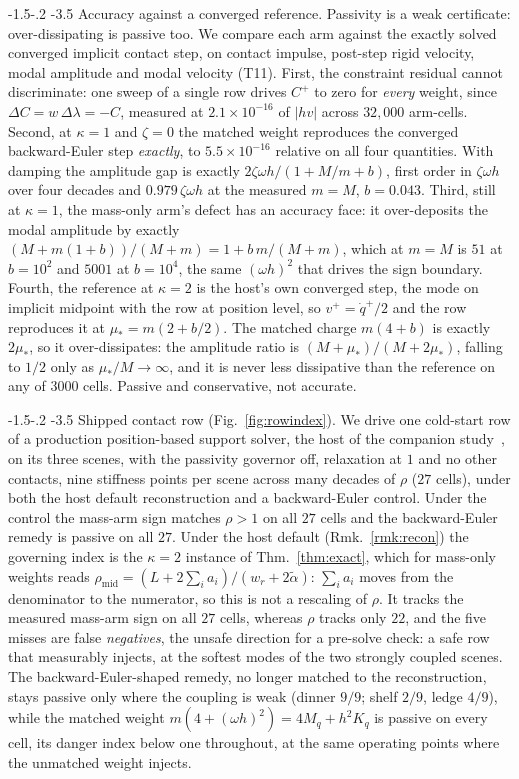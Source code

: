 \documentclass[sigconf,screen,review,anonymous]{acmart}
\makeatletter
\newcommand{\rih}{\def\@toclevel{4}%
  \@startsection{paragraph}{4}{\parindent}%
  {-1.5\p@ \@plus -1\p@ \@minus -.2\p@}%
  {-3.5\p@}%
  {\ACM@NRadjust{\@parfont\@adddotafter}}}
\newcommand{\Rr}{w_{r}}
\newcommand{\oh}{\omega h}
\theoremstyle{acmdefinition}
\makeatother
\begin{document}
\rih{Accuracy against a converged reference.} Passivity is a weak
certificate: over-dissipating is passive too. We compare each arm against the
exactly solved converged implicit contact step, on contact impulse, post-step
rigid velocity, modal amplitude and modal velocity (T11).
First, the constraint residual cannot discriminate: one sweep of a single
row drives $C^{+}$ to zero for \emph{every} weight, since
$\Delta C = w\,\Delta\lambda = -C$, measured at $2.1\times10^{-16}$ of $|hv|$ across
$32{,}000$ arm-cells. Second, at $\kappa = 1$ and $\zeta = 0$ the matched weight
reproduces the converged backward-Euler step \emph{exactly}, to
$5.5\times10^{-16}$ relative on all four quantities. With
damping the amplitude gap is exactly $2\zeta\oh/(1 + M/m + b)$, first order in
$\zeta\oh$ over four decades and $0.979\,\zeta\oh$ at the measured $m = M$,
$b = 0.043$. Third, still at $\kappa = 1$, the mass-only arm's
defect has an accuracy face: it over-deposits the modal amplitude by exactly
$(M + m(1+b))/(M+m) = 1 + b\,m/(M+m)$, which at $m = M$ is
$51$ at $b = 10^{2}$ and $5001$ at $b = 10^{4}$, the same
$(\oh)^2$ that drives the sign boundary. Fourth, the
reference at $\kappa = 2$ is the host's own converged step, the mode on implicit
midpoint with the row at position level, so $v^{+} = \dot q^{+}/2$ and
the row reproduces it at $\mu_{\ast} = m(2 + b/2)$. The matched
charge $m(4+b)$ is exactly $2\mu_{\ast}$, so it over-dissipates: the amplitude
ratio is $(M + \mu_{\ast})/(M + 2\mu_{\ast})$, falling to $1/2$ only as
$\mu_{\ast}/M \to \infty$, and it is never less dissipative than the reference
on any of $3000$ cells. Passive and conservative, not accurate.

\rih{Shipped contact row (Fig.~\ref{fig:rowindex}).} We drive one
cold-start row of a production position-based support solver, the host of the
companion study~\citep{companion2026diagnosis}, on its three scenes, with the
passivity governor off, relaxation at $1$ and no other contacts, nine stiffness
points per scene across many decades of $\rho$ ($27$ cells), under both the host
default reconstruction and a backward-Euler control.
Under the control the mass-arm sign matches $\rho > 1$ on all $27$ cells and the
backward-Euler remedy is passive on all $27$. Under the
host default (Rmk.~\ref{rmk:recon}) the governing index is the
$\kappa = 2$ instance of Thm.~\ref{thm:exact}, which for mass-only weights reads
$\rho_{\mathrm{mid}} = (L + 2\sum_i a_i)/(\Rr + 2\tilde\alpha)$: $\sum_i a_i$
moves from the denominator to the numerator, so this is not a rescaling of
$\rho$. It tracks the measured mass-arm sign on all $27$ cells, whereas $\rho$
tracks only $22$, and the five misses are false \emph{negatives}, the unsafe
direction for a pre-solve check: a safe row that measurably injects, at the
softest modes of the two strongly coupled scenes. The backward-Euler-shaped
remedy, no longer matched to the reconstruction, stays passive only where the
coupling is weak (dinner $9/9$; shelf $2/9$, ledge $4/9$), while the matched
weight $m(4 + (\oh)^2) = 4 M_q + h^2 K_q$ is passive on every cell, its danger
index below one throughout, at the same operating points where the unmatched
weight injects.
\end{document}
